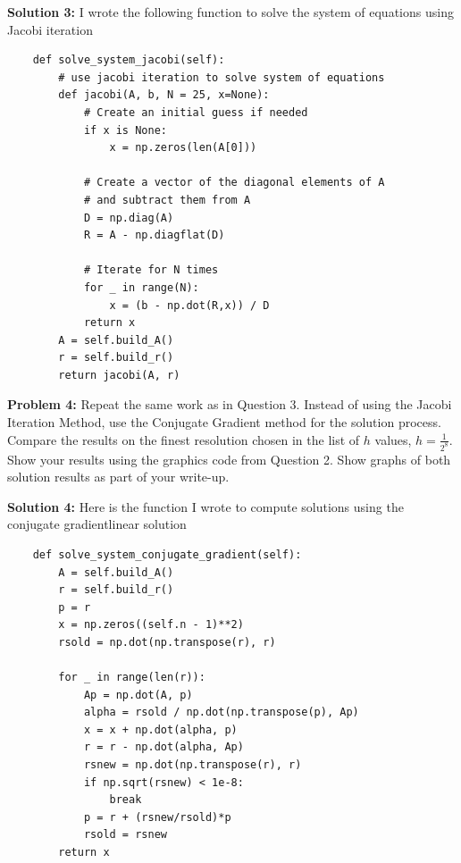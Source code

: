 \documentclass[10pt]{article}
\newcommand{\1}{\mathbb{1}}
\begin{document}
\textbf{Solution 3:} I wrote the following function to solve the system of equations using Jacobi iteration

\begin{verbatim}
    def solve_system_jacobi(self):
        # use jacobi iteration to solve system of equations
        def jacobi(A, b, N = 25, x=None):
            # Create an initial guess if needed                                                                                                                                                            
            if x is None:
                x = np.zeros(len(A[0]))

            # Create a vector of the diagonal elements of A                                                                                                                                                
            # and subtract them from A                                                                                                                                                                     
            D = np.diag(A)
            R = A - np.diagflat(D)

            # Iterate for N times                                                                                                                                                                          
            for _ in range(N):
                x = (b - np.dot(R,x)) / D
            return x
        A = self.build_A() 
        r = self.build_r()
        return jacobi(A, r)
\end{verbatim}

\textbf{Problem 4:} Repeat the same work as in Question 3. Instead of using the Jacobi Iteration Method, use the Conjugate Gradient method for the solution process. Compare the results on the finest resolution chosen in the list of $h$ values, $h = \frac{1}{2^8}$. Show your results using the graphics code from Question 2. Show graphs of both solution results as part of your write-up.

\textbf{Solution 4:} Here is the function I wrote to compute solutions using the conjugate gradientlinear solution

\begin{verbatim}
    def solve_system_conjugate_gradient(self):
        A = self.build_A()
        r = self.build_r()
        p = r
        x = np.zeros((self.n - 1)**2)
        rsold = np.dot(np.transpose(r), r)
        
        for _ in range(len(r)):
            Ap = np.dot(A, p)
            alpha = rsold / np.dot(np.transpose(p), Ap)
            x = x + np.dot(alpha, p)
            r = r - np.dot(alpha, Ap)
            rsnew = np.dot(np.transpose(r), r)
            if np.sqrt(rsnew) < 1e-8:
                break
            p = r + (rsnew/rsold)*p
            rsold = rsnew
        return x
\end{verbatim}
\end{document}
